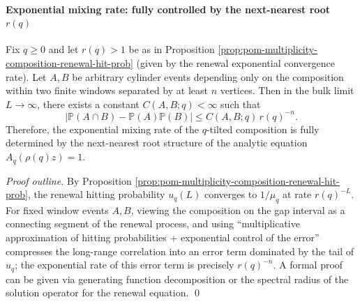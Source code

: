 \paragraph{Exponential mixing rate: fully controlled by the next-nearest root \texorpdfstring{$r(q)$}{r(q)}}
\begin{theorem}\label{thm:pom-multiplicity-composition-exponential-mixing-generalq}
Fix \(q\ge 0\) and let \(r(q)>1\) be as in Proposition \ref{prop:pom-multiplicity-composition-renewal-hit-prob} (given by the renewal exponential convergence rate).
Let \(A,B\) be arbitrary cylinder events depending only on the composition within two finite windows separated by at least \(n\) vertices.
Then in the bulk limit \(L\to\infty\), there exists a constant \(C(A,B;q)<\infty\) such that
\[
\boxed{\;
\bigl|\mathbb{P}(A\cap B)-\mathbb{P}(A)\mathbb{P}(B)\bigr|
\le C(A,B;q)\,r(q)^{-n}.\;}
\]
Therefore, the exponential mixing rate of the \(q\)-tilted composition is fully determined by the next-nearest root structure of the analytic equation \(A_q(\rho(q)z)=1\).
\end{theorem}
\begin{proof}[Proof outline]
By Proposition \ref{prop:pom-multiplicity-composition-renewal-hit-prob},
the renewal hitting probability \(u_q(L)\) converges to \(1/\mu_q\) at rate \(r(q)^{-L}\).
For fixed window events \(A,B\), viewing the composition on the gap interval as a connecting segment of the renewal process,
and using ``multiplicative approximation of hitting probabilities + exponential control of the error'' compresses the long-range correlation into an error term dominated by the tail of \(u_q\);
the exponential rate of this error term is precisely \(r(q)^{-n}\).
A formal proof can be given via generating function decomposition or the spectral radius of the solution operator for the renewal equation. \qed
\end{proof}
\endinput






